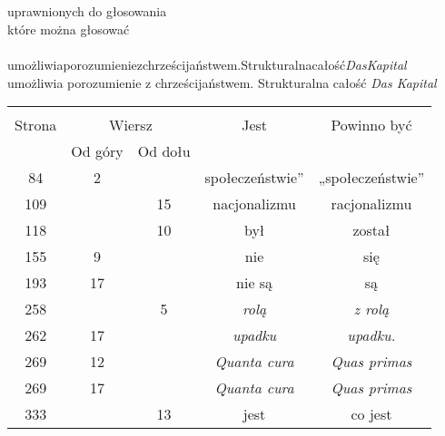 \documentclass[a4paper,11pt]{article}
\begin{document}
\noindent \\
 \\
\Jest  uprawnionych do głosowania \\
\Powin które można głosować \\
 \\
\Jest  umożliwiaporozumieniezchrześcijaństwem.Strukturalnacałość\emph{DasKapital}
\\
\Powin umożliwia porozumienie z chrześcijaństwem. Strukturalna całość
\emph{Das Kapital} \\

\vspace{\spaceTwo}







\begin{center}

  \begin{tabular}{|c|c|c|c|c|}
    \hline
    & \multicolumn{2}{c|}{} & & \\
    Strona & \multicolumn{2}{c|}{Wiersz} & Jest
                              & Powinno być \\ \cline{2-3}
    & Od góry & Od dołu & & \\
    \hline
    84  &  2 & & społeczeństwie” & „społeczeństwie” \\
    109 & & 15 & nacjonalizmu & racjonalizmu \\
    118 & & 10 & był & został \\
    155 &  9 & & nie & się \\
    193 & 17 & & nie są & są \\
    258 & &  5 & \emph{rolą} & \emph{z rolą} \\
    262 & 17 & & \emph{upadku} & \emph{upadku.} \\
    269 & 12 & & \emph{Quanta cura} & \emph{Quas primas} \\
    269 & 17 & & \emph{Quanta cura} & \emph{Quas primas} \\
    333 & & 13 & jest & co jest \\
    \hline
  \end{tabular}

\end{center}
\end{document}
